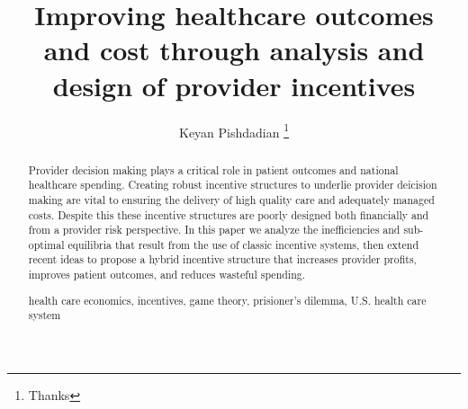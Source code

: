 \documentclass[a4paper]{llncs}
\newcommand{\keywords}[1]{\par\addvspace\baselineskip
\noindent\keywordname\enspace\ignorespaces#1}
\begin{document}
\mainmatter  %

\title{Improving healthcare outcomes and cost through analysis and design of provider incentives}


%
%
\author{Keyan Pishdadian%
    \thanks{Thanks}%
}
%


%
%

\maketitle


\begin{abstract}
Provider decision making plays a critical role in patient outcomes and national healthcare spending. Creating robust incentive structures to underlie provider deicision making are vital to ensuring the delivery of high quality care and adequately managed costs. Despite this these incentive structures are poorly designed both financially and from a provider risk perspective. In this paper we analyze the inefficiencies and sub-optimal equilibria that result from the use of classic incentive systems, then extend recent ideas to propose a hybrid incentive structure that increases provider profits, improves patient outcomes, and reduces wasteful spending.

\keywords{health care economics, incentives, game theory, prisioner's dilemma, U.S. health care system}
\end{abstract}
\end{document}
